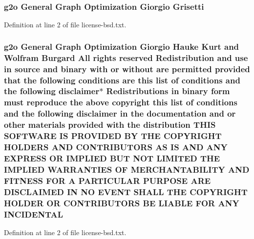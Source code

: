 \subsubsection[{\texorpdfstring{Grisetti}{Grisetti}}]{\setlength{\rightskip}{0pt plus 5cm}g2o General Graph Optimization Giorgio Grisetti}\hypertarget{license-bsd_8txt_aae7062157d7e4ac6870ccd09c39484b8}{}\label{license-bsd_8txt_aae7062157d7e4ac6870ccd09c39484b8}


Definition at line 2 of file license-\/bsd.\+txt.

\subsubsection[{\texorpdfstring{I\+N\+C\+I\+D\+E\+N\+T\+AL}{INCIDENTAL}}]{\setlength{\rightskip}{0pt plus 5cm}g2o General Graph Optimization Giorgio Hauke Kurt and Wolfram Burgard All rights reserved Redistribution and use in source and binary with or without are permitted provided that the following conditions are this list of conditions and the following disclaimer$\ast$ Redistributions in binary form must reproduce the above copyright this list of conditions and the following disclaimer in the documentation and or other materials provided with the distribution T\+H\+IS S\+O\+F\+T\+W\+A\+RE IS P\+R\+O\+V\+I\+D\+ED BY T\+HE C\+O\+P\+Y\+R\+I\+G\+HT H\+O\+L\+D\+E\+RS A\+ND C\+O\+N\+T\+R\+I\+B\+U\+T\+O\+RS AS IS A\+ND A\+NY E\+X\+P\+R\+E\+SS OR I\+M\+P\+L\+I\+ED B\+UT N\+OT L\+I\+M\+I\+T\+ED T\+HE I\+M\+P\+L\+I\+ED {\bf W\+A\+R\+R\+A\+N\+T\+I\+ES} OF M\+E\+R\+C\+H\+A\+N\+T\+A\+B\+I\+L\+I\+TY A\+ND F\+I\+T\+N\+E\+SS F\+OR A P\+A\+R\+T\+I\+C\+U\+L\+AR P\+U\+R\+P\+O\+SE A\+RE D\+I\+S\+C\+L\+A\+I\+M\+ED IN NO E\+V\+E\+NT S\+H\+A\+LL T\+HE C\+O\+P\+Y\+R\+I\+G\+HT H\+O\+L\+D\+ER OR C\+O\+N\+T\+R\+I\+B\+U\+T\+O\+RS BE L\+I\+A\+B\+LE F\+OR A\+NY I\+N\+C\+I\+D\+E\+N\+T\+AL}\hypertarget{license-bsd_8txt_ae70dc8dc15071b5e6c79dea302039859}{}\label{license-bsd_8txt_ae70dc8dc15071b5e6c79dea302039859}


Definition at line 2 of file license-\/bsd.\+txt.

